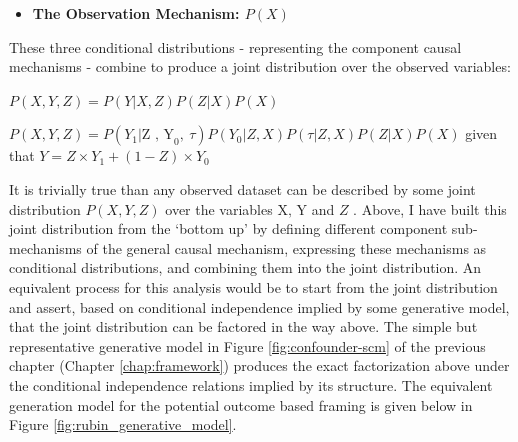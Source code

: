 \documentclass[../main.tex]{subfiles}
\begin{document}
\begin{itemize}
\vspace{\baselineskip}
    \item \textbf{The Observation Mechanism:  \( P \left( X \right)  \)  }
\end{itemize}\par


\vspace{\baselineskip}
These three conditional distributions - representing the component causal mechanisms - combine to produce a joint distribution over the observed variables:\par


\vspace{\baselineskip}
\begin{adjustwidth}{0.5in}{0.0in}
 \( P \left( X, Y, Z \right)  = P \left( Y \vert X, Z \right) P \left( Z  \vert  X \right) P \left( X \right)  \) \par

\end{adjustwidth}

\begin{adjustwidth}{0.5in}{0.0in}
 \( P \left( X, Y, Z \right)  = P \left( Y_{1}  \vert  \text{Z , Y}_{0},~ \tau \right) P \left( Y_{0} \vert Z, X \right) P \left(  \tau \vert Z, X \right) P \left( Z  \vert  X \right) P \left( X \right)  \) given that  \(  Y=Z \times Y_{1}+ \left( 1-Z \right)  \times Y_{0} \) \par

\end{adjustwidth}


\vspace{\baselineskip}
It is trivially true than any observed dataset can be described by some joint distribution  \( P \left( X, Y, Z \right)  \)  over the variables  \( \text{X, Y} \) and  \( Z \) . Above, I have built this joint distribution from the ‘bottom up’ by defining different component sub-mechanisms of the general causal mechanism, expressing these mechanisms as conditional distributions, and combining them into the joint distribution. An equivalent process for this analysis would be to start from the joint distribution and assert, based on conditional independence implied by some generative model, that the joint distribution can be factored in the way above. The simple but representative generative model in Figure \ref{fig:confounder-scm} of the previous chapter (Chapter \ref{chap:framework}) produces the exact factorization above under the conditional independence relations implied by its structure. The equivalent generation model for the potential outcome based framing is given below in Figure \ref{fig:rubin_generative_model}.\par
\end{document}
